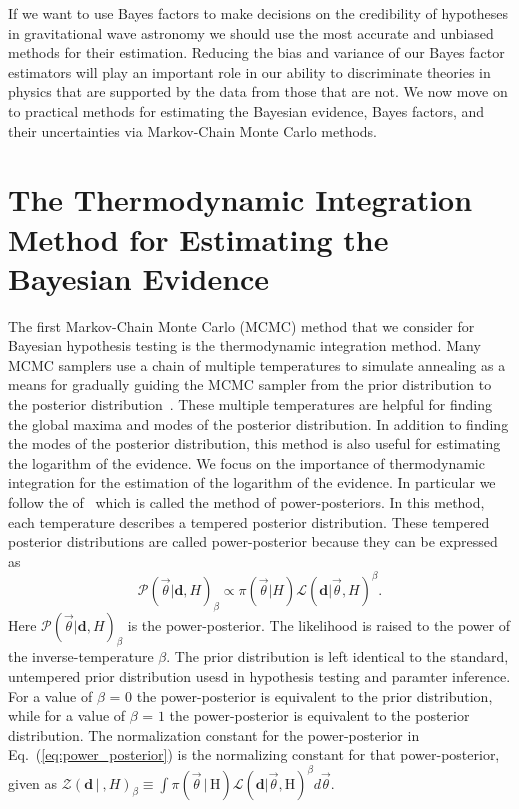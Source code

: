 If we want to use Bayes factors to make decisions on the credibility of hypotheses in gravitational wave astronomy we should use the most accurate and unbiased methods for their estimation. Reducing the bias and variance of our Bayes factor estimators will play an important role in our ability to discriminate theories in physics that are supported by the data from those that are not. We now move on to practical methods for estimating the Bayesian evidence, Bayes factors, and their uncertainties via Markov-Chain Monte Carlo methods.

\section{The Thermodynamic Integration Method for Estimating the Bayesian Evidence}\label{sec:ti}
The first Markov-Chain Monte Carlo (MCMC) method that we consider for Bayesian hypothesis testing is the thermodynamic integration method. Many MCMC samplers use a chain of multiple temperatures to simulate annealing as a means for gradually guiding the MCMC sampler from the prior distribution to the posterior distribution~\citep{emcee, vousden:2016, doi:10.1143/PTPS.157.317, B509983H}. These multiple temperatures are helpful for finding the global maxima and modes of the posterior distribution. In addition to finding the modes of the posterior distribution, this method is also useful for estimating the logarithm of the evidence. We focus on the importance of thermodynamic integration for the estimation of the logarithm of the evidence. In particular we follow the of~\cite{lartillot2006computing, friel2008marginal} which is called the method of power-posteriors. In this method, each temperature describes a tempered posterior distribution. These tempered posterior distributions are called power-posterior because they can be expressed as
\begin{equation}
    \mathcal{P}\left(\vec{\theta}|\mathbf{d}, H\right)_\beta \propto \pi\left(\vec{\theta} | H\right) \mathcal{L}\left(\mathbf{d} | \vec{\theta}, H\right)^\beta.
\end{equation}\label{eq:power_posterior}
Here $\mathcal{P}\left(\vec{\theta}|\mathbf{d}, H\right)_\beta$ is the power-posterior. The likelihood is raised to the power of the inverse-temperature $\beta$. The prior distribution is left identical to the standard, untempered prior distribution usesd in hypothesis testing and paramter inference. For a value of $\beta$ = $0$ the power-posterior is equivalent to the prior distribution, while for a value of $\beta$ = $1$ the power-posterior is equivalent to the posterior distribution. The normalization constant for the power-posterior in Eq.~(\ref{eq:power_posterior}) is the normalizing constant for that power-posterior, given as $\mathcal{Z}(\mathbf{d} \, | \ ,H)_\beta \equiv \int \pi\left(\vec{\theta} \, | \, \mathrm{H}\right) \mathcal{L}\left(\mathbf{d} | \vec{\theta}, \mathrm{H}\right)^\beta d\vec{\theta}$.

